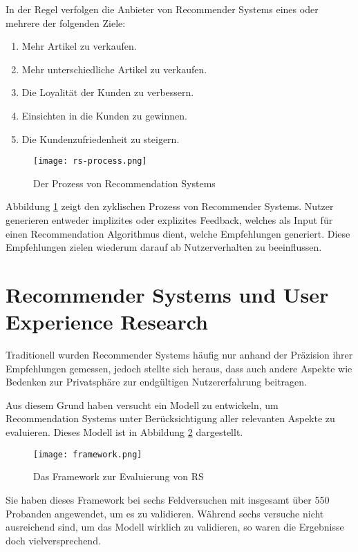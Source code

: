 In der Regel verfolgen die Anbieter von Recommender Systems eines oder mehrere der folgenden Ziele:

\begin{enumerate}
  \item Mehr Artikel zu verkaufen.
  \item Mehr unterschiedliche Artikel zu verkaufen.
  \item Die Loyalität der Kunden zu verbessern.
  \item Einsichten in die Kunden zu gewinnen.
  \item Die Kundenzufriedenheit zu steigern.
\end{enumerate}

\parencite{ricci_recommender_2022}

\begin{figure}[H]
  \centering
  \texttt{[image: rs-process.png]}
  \caption{Der Prozess von Recommendation Systems}\label{fig:process}
\end{figure}

Abbildung \ref{fig:process} zeigt den zyklischen Prozess von Recommender Systems.
Nutzer generieren entweder implizites oder explizites Feedback, welches als Input für einen Recommendation Algorithmus dient, welche Empfehlungen generiert.
Diese Empfehlungen zielen wiederum darauf ab Nutzerverhalten zu beeinflussen.

\section{Recommender Systems und User Experience Research}

Traditionell wurden Recommender Systems häufig nur anhand der Präzision ihrer Empfehlungen gemessen, jedoch stellte sich heraus, dass auch andere Aspekte wie Bedenken zur Privatsphäre zur endgültigen Nutzererfahrung beitragen.

Aus diesem Grund haben \citeauthor{knijnenburg_explaining_2012} versucht ein Modell zu entwickeln, um Recommendation Systems unter Berücksichtigung aller relevanten Aspekte zu evaluieren.
Dieses Modell ist in Abbildung \ref{fig:framework} dargestellt.

\begin{figure}[H]
  \centering
  \texttt{[image: framework.png]}
  \caption{Das Framework zur Evaluierung von RS}\label{fig:framework}
  \parencite{knijnenburg_explaining_2012}
\end{figure}

Sie haben dieses Framework bei sechs Feldversuchen mit insgesamt über 550 Probanden angewendet, um es zu validieren.
Während sechs versuche nicht ausreichend sind, um das Modell wirklich zu validieren, so waren die Ergebnisse doch vielversprechend.
